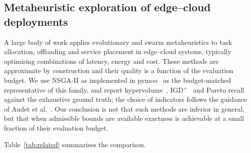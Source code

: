 \documentclass[preprint,11pt,3p]{elsarticle}
\theoremstyle{plain}
\theoremstyle{definition}
\begin{document}
\subsection{Metaheuristic exploration of edge--cloud deployments}
A large body of work applies evolutionary and swarm metaheuristics to task allocation,
offloading and service placement in edge--cloud systems, typically optimising
combinations of latency, energy and cost. These methods are approximate by construction
and their quality is a function of the evaluation budget. We use NSGA-II
\cite{deb2002nsga2} as implemented in pymoo~\cite{blank2020pymoo} as the budget-matched
representative of this family, and report hypervolume~\cite{zitzler1999hv},
IGD$^{+}$~\cite{ishibuchi2015igdplus} and Pareto recall against the exhaustive ground
truth; the choice of indicators follows the guidance of
Audet et al.~\cite{audet2021indicators}. Our conclusion is not that such methods are inferior in general, but that when
admissible bounds are available exactness is achievable at a small fraction of their
evaluation budget.

Table~\ref{tab:related} summarises the comparison.
\end{document}
